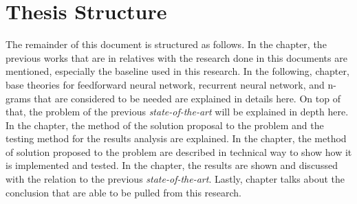 \section{Thesis Structure}
    The remainder of this document is structured as follows. In the
     chapter, the previous works that are in
    relatives with the research done in this documents are mentioned,
    especially the baseline used in this research. In the following,
     chapter, base theories for
    feedforward neural network, recurrent neural network, and n-grams
    that are considered to be needed are explained in details here. On
    top of that, the problem of the previous \textit{state-of-the-art}
    will be explained in depth here. In the 
    chapter, the method of the solution proposal to the problem and
    the testing method for the results analysis are explained. In the
     chapter, the method of solution
    proposed to the problem are described in technical way to show how
    it is implemented and tested. In the 
    chapter, the results are shown and discussed with the relation to
    the previous \textit{state-of-the-art}. Lastly,
     chapter talks about the conclusion that are
    able to be pulled from this research.